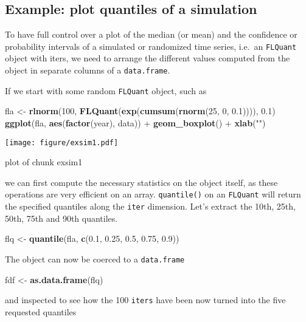 \documentclass{tufte-handout}
\newenvironment{Shaded}{}{}
\newcommand{\KeywordTok}[1]{\textcolor[rgb]{0.00,0.44,0.13}{\textbf{{#1}}}}
\newcommand{\DecValTok}[1]{\textcolor[rgb]{0.25,0.63,0.44}{{#1}}}
\newcommand{\FloatTok}[1]{\textcolor[rgb]{0.25,0.63,0.44}{{#1}}}
\newcommand{\StringTok}[1]{\textcolor[rgb]{0.25,0.44,0.63}{{#1}}}
\newcommand{\NormalTok}[1]{{#1}}
\begin{document}
\subsection{Example: plot quantiles of a simulation}

To have full control over a plot of the median (or mean) and the
confidence or probability intervals of a simulated or randomized time
series, i.e.~an \texttt{FLQuant} object with iters, we need to arrange
the different values computed from the object in separate columns of a
\texttt{data.frame}.

If we start with some random \texttt{FLQuant} object, such as

\begin{Shaded}
\begin{Highlighting}[]
\NormalTok{fla <- }\KeywordTok{rlnorm}\NormalTok{(}\DecValTok{100}\NormalTok{, }\KeywordTok{FLQuant}\NormalTok{(}\KeywordTok{exp}\NormalTok{(}\KeywordTok{cumsum}\NormalTok{(}\KeywordTok{rnorm}\NormalTok{(}\DecValTok{25}\NormalTok{, }\DecValTok{0}\NormalTok{, }
    \FloatTok{0.1}\NormalTok{)))), }\FloatTok{0.1}\NormalTok{)}
\KeywordTok{ggplot}\NormalTok{(fla, }\KeywordTok{aes}\NormalTok{(}\KeywordTok{factor}\NormalTok{(year), data)) + }\KeywordTok{geom_boxplot}\NormalTok{() + }
    \KeywordTok{xlab}\NormalTok{(}\StringTok{""}\NormalTok{)}
\end{Highlighting}
\end{Shaded}
\begin{marginfigure}
\centering
\texttt{[image: figure/exsim1.pdf]}
\caption{plot of chunk exsim1}
\end{marginfigure}

we can first compute the necessary statistics on the object itself, as
these operations are very efficient on an array. \texttt{quantile()} on
an \texttt{FLQuant} will return the specified quantiles along the
\texttt{iter} dimension. Let's extract the 10th, 25th, 50th, 75th and
90th quantiles.

\begin{Shaded}
\begin{Highlighting}[]
\NormalTok{flq <- }\KeywordTok{quantile}\NormalTok{(fla, }\KeywordTok{c}\NormalTok{(}\FloatTok{0.1}\NormalTok{, }\FloatTok{0.25}\NormalTok{, }\FloatTok{0.5}\NormalTok{, }\FloatTok{0.75}\NormalTok{, }\FloatTok{0.9}\NormalTok{))}
\end{Highlighting}
\end{Shaded}
The object can now be coerced to a \texttt{data.frame}

\begin{Shaded}
\begin{Highlighting}[]
\NormalTok{fdf <- }\KeywordTok{as.data.frame}\NormalTok{(flq)}
\end{Highlighting}
\end{Shaded}
and inspected to see how the 100 \texttt{iters} have been now turned
into the five requested quantiles
\end{document}
